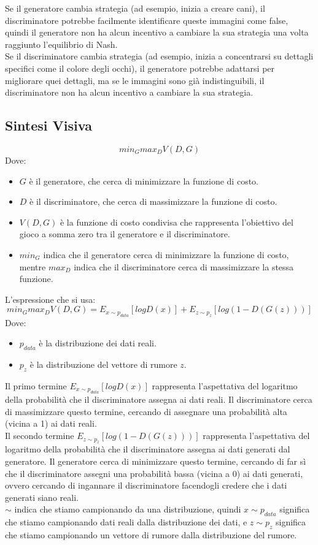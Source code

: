 Se il generatore cambia strategia (ad esempio, inizia a creare cani), il discriminatore potrebbe facilmente identificare queste immagini come false, quindi il generatore non ha alcun incentivo a cambiare la sua strategia una volta raggiunto l'equilibrio di Nash.\\
Se il discriminatore cambia strategia (ad esempio, inizia a concentrarsi su dettagli specifici come il colore degli occhi), il generatore potrebbe adattarsi per migliorare quei dettagli, ma se le immagini sono già indistinguibili, il discriminatore non ha alcun incentivo a cambiare la sua strategia.\\

\subsection{Sintesi Visiva}

$$min_G max_D V(D, G)$$
Dove:
\begin{itemize}
    \item $G$ è il generatore, che cerca di minimizzare la funzione di costo.
    \item $D$ è il discriminatore, che cerca di massimizzare la funzione di costo.
    \item $V(D, G)$ è la funzione di costo condivisa che rappresenta l'obiettivo del gioco a somma zero tra il generatore e il discriminatore.
    \item $min_G$ indica che il generatore cerca di minimizzare la funzione di costo, mentre $max_D$ indica che il discriminatore cerca di massimizzare la stessa funzione.
\end{itemize}

L'espressione che si usa:
$$min_G max_D V(D, G) = E_{x \sim p_{data}}[log D(x)] + E_{z \sim p_z}[log(1 - D(G(z)))]$$
Dove:
\begin{itemize}
    \item $p_{data}$ è la distribuzione dei dati reali.
    \item $p_z$ è la distribuzione del vettore di rumore $z$.
\end{itemize}

Il primo termine $E_{x \sim p_{data}}[log D(x)]$ rappresenta l'aspettativa del logaritmo della probabilità che il discriminatore assegna ai dati reali. Il discriminatore cerca di massimizzare questo termine, cercando di assegnare una probabilità alta (vicina a 1) ai dati reali.\\
Il secondo termine $E_{z \sim p_z}[log(1 - D(G(z)))]$ rappresenta l'aspettativa del logaritmo della probabilità che il discriminatore assegna ai dati generati dal generatore. Il generatore cerca di minimizzare questo termine, cercando di far sì che il discriminatore assegni una probabilità bassa (vicina a 0) ai dati generati, ovvero cercando di ingannare il discriminatore facendogli credere che i dati generati siano reali.\\
$\sim$ indica che stiamo campionando da una distribuzione, quindi $x \sim p_{data}$ significa che stiamo campionando dati reali dalla distribuzione dei dati, e $z \sim p_z$ significa che stiamo campionando un vettore di rumore dalla distribuzione del rumore.\\


